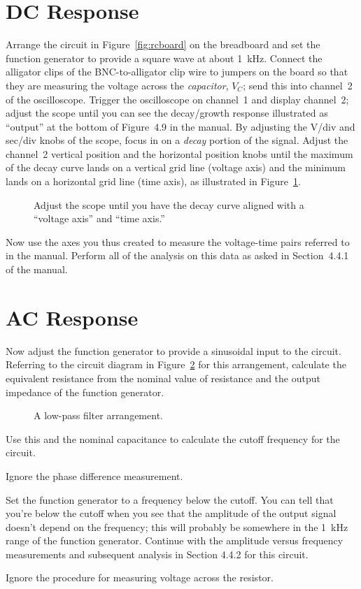 \documentclass[12pt]{article}
\begin{document}
\section{DC Response}
Arrange the circuit in Figure~\ref{fig:rcboard} on the breadboard and set the 
function generator to provide a square wave at about 1~kHz.  Connect the 
alligator clips of the BNC-to-alligator clip wire to jumpers on the board 
so that they are measuring the voltage across the {\it capacitor}, $V_C$; 
send this into channel~2 of the oscilloscope. Trigger the oscilloscope on 
channel~1 and display channel~2; adjust the scope until
you can see the decay/growth response illustrated as ``output'' at the bottom
of Figure~4.9 in the manual.  By adjusting the V/div and sec/div knobs of the
scope, focus in on a {\it decay} portion of the signal. Adjust the channel~2
vertical position and the horizontal position knobs until the maximum of the 
decay curve lands on a vertical grid line (voltage axis) and the minimum lands 
on a horizontal grid line (time axis), as illustrated in 
Figure~\ref{fig:scope}.
\begin{figure}[htb]
\epsfxsize=8cm
\centerline{}
\caption{Adjust the scope until you have the decay curve aligned with a 
``voltage axis'' and ``time axis.''}
\label{fig:scope}
\end{figure}
Now use the axes you thus created to measure the voltage-time pairs referred to
in the manual. Perform all of the analysis on this data as asked in 
Section~4.4.1 of the manual.

\section{AC Response}
Now adjust the function generator to provide a sinusoidal input to the circuit.
Referring to the circuit diagram in Figure~\ref{fig:lowpass} for this 
arrangement, calculate the equivalent resistance from the nominal value of 
resistance and the output impedance of the function generator. 
\begin{figure}[htb]
\epsfxsize=8cm
\centerline{}
\caption{A low-pass filter arrangement.}
\label{fig:lowpass}
\end{figure}
Use this and the nominal capacitance to calculate the cutoff frequency for the 
circuit. 

Ignore the phase difference measurement. 

Set the function generator to a 
frequency below the cutoff. You can tell that you're below the cutoff when you 
see that the amplitude of the output signal doesn't depend on the frequency;
this will probably be somewhere in the 1~kHz range of the function generator. 
Continue with the amplitude versus frequency measurements and subsequent
analysis in Section 4.4.2 for this circuit. 

Ignore the procedure for measuring voltage across the resistor.
\end{document}
